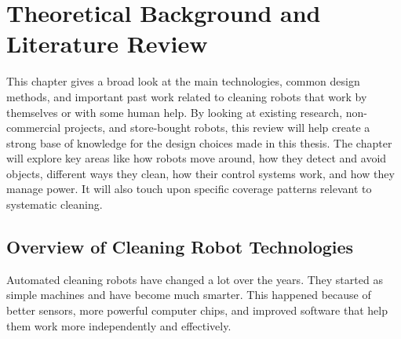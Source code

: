 \chapter{Theoretical Background and Literature Review}
\label{chap:background}

This chapter gives a broad look at the main technologies, common design methods, and important past work related to cleaning robots that work by themselves or with some human help. By looking at existing research, non-commercial projects, and store-bought robots, this review will help create a strong base of knowledge for the design choices made in this thesis. The chapter will explore key areas like how robots move around, how they detect and avoid objects, different ways they clean, how their control systems work, and how they manage power. It will also touch upon specific coverage patterns relevant to systematic cleaning.

\section{Overview of Cleaning Robot Technologies}
\label{sec:overview_tech_lit}
Automated cleaning robots have changed a lot over the years. They started as simple machines and have become much smarter. This happened because of better sensors, more powerful computer chips, and improved software that help them work more independently and effectively.

